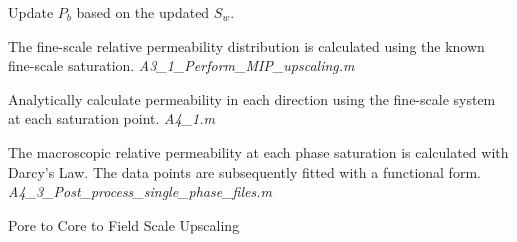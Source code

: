 \begin{algorithm}[H]
{{{      Update $P_b$ based on the updated $S_w$.

      }

      The fine-scale relative permeability distribution is calculated using the known fine-scale saturation. \textit{A3\_1\_Perform\_MIP\_upscaling.m} \\
      }

      Analytically calculate permeability in each direction using the fine-scale system at each saturation point. \textit{A4\_1.m}


      The macroscopic relative permeability at each phase saturation is calculated with Darcy's Law. The data points are subsequently fitted with a functional form. \textit{A4\_3\_Post\_process\_single\_phase\_files.m}\\


      }
      \caption{Pore to Core to Field Scale Upscaling}
      \label{Pore2Core}
  \end{algorithm}



